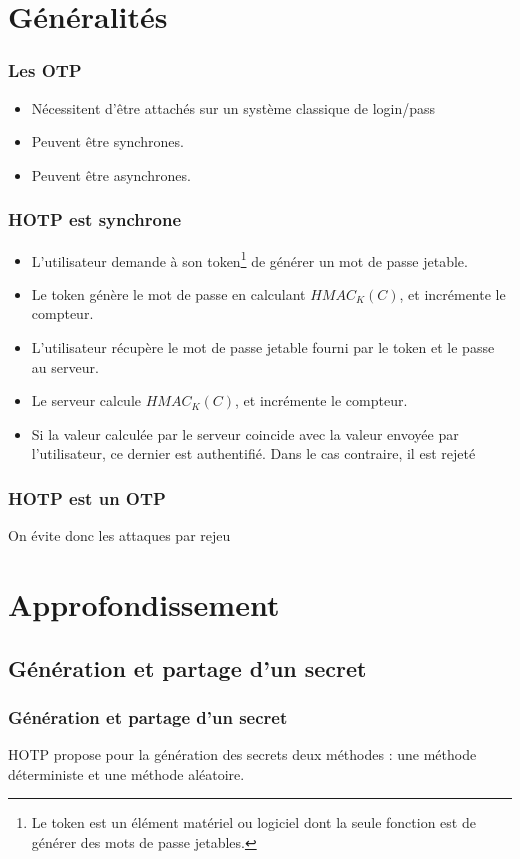 \documentclass{beamer}
\begin{document}
\section{G\'en\'eralit\'es}

\begin{frame}
\frametitle{Les OTP}

\begin{itemize}
 \item N\'ecessitent d'\^etre attach\'es sur un syst\`eme classique de login/pass
 \pause\item Peuvent \^etre synchrones.
 \pause\item Peuvent \^etre asynchrones.
\end{itemize}
\end{frame}

\begin{frame}
\frametitle{HOTP est synchrone}
\begin{itemize}
 \item L'utilisateur demande \`a son token\footnote{Le token est un \'el\'ement mat\'eriel ou logiciel dont la seule fonction est de g\'en\'erer des mots de passe jetables.} de 
 g\'en\'erer un mot de passe jetable.
\pause \item Le token g\'en\`ere le mot de passe en calculant $HMAC_K(C)$, et incr\'emente le compteur.
\pause \item L'utilisateur r\'ecup\`ere le mot de passe jetable fourni par le token et le passe au serveur.
\pause \item Le serveur calcule $HMAC_K(C)$, et incr\'emente le compteur.
\pause \item Si la valeur calcul\'ee par le serveur coincide avec la valeur envoy\'ee par l'utilisateur, ce dernier est authentifi\'e. Dans le cas contraire, il est rejet\'e
\end{itemize}
\end{frame}

\begin{frame}
\frametitle{HOTP est un OTP}
On \'evite donc les attaques \og{}par rejeu\fg{}
\end{frame}

\section{Approfondissement}
\subsection{G\'en\'eration et partage d'un secret}
\begin{frame}
\frametitle{G\'en\'eration et partage d'un secret}
\og{}HOTP\fg{} propose pour la g\'en\'eration des secrets deux m\'ethodes : une m\'ethode d\'eterministe et une m\'ethode al\'eatoire. 
\end{frame}
\end{document}
